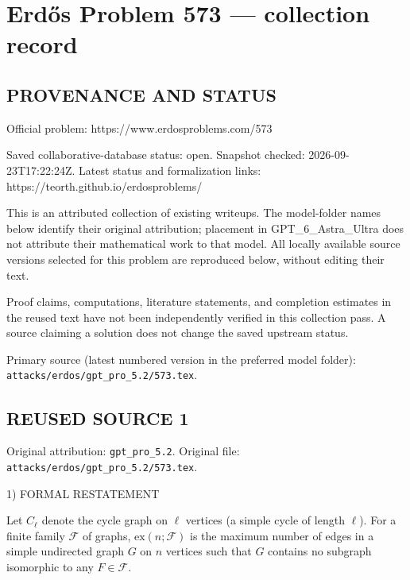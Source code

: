 \section*{Erd\H{o}s Problem 573 --- collection record}

\subsection*{PROVENANCE AND STATUS}
Official problem: https://www.erdosproblems.com/573

Saved collaborative-database status: open.
Snapshot checked: 2026-09-23T17:22:24Z.
Latest status and formalization links: https://teorth.github.io/erdosproblems/

This is an attributed collection of existing writeups. The model-folder names below identify their original attribution; placement in GPT\_6\_Astra\_Ultra does not attribute their mathematical work to that model. All locally available source versions selected for this problem are reproduced below, without editing their text.

Proof claims, computations, literature statements, and completion estimates in the reused text have not been independently verified in this collection pass. A source claiming a solution does not change the saved upstream status.

Primary source (latest numbered version in the preferred model folder): \texttt{attacks/erdos/gpt\_pro\_5.2/573.tex}.

\subsection*{REUSED SOURCE 1}
Original attribution: \texttt{gpt\_pro\_5.2}.
Original file: \texttt{attacks/erdos/gpt\_pro\_5.2/573.tex}.



1) FORMAL RESTATEMENT

Let $C_\ell$ denote the cycle graph on $\ell$ vertices (a simple cycle of length $\ell$).  
For a finite family $\mathcal{F}$ of graphs, $\mathrm{ex}(n;\mathcal{F})$ is the maximum number of edges in a simple undirected graph $G$ on $n$ vertices such that $G$ contains no subgraph isomorphic to any $F\in\mathcal{F}$.

